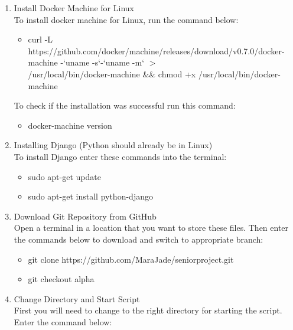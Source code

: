 \documentclass[draftclsnofoot,10pt,onecolumn]{IEEEtran} %
\begin{document}
\begin{enumerate}
	\item Install Docker Machine for Linux \\
	To install docker machine for Linux, run the command below:
	
	\begin{itemize}
		\item curl -L https://github.com/docker/machine/releases/download/v0.7.0/docker-machine -`uname -s`-`uname -m` 
		$>$ \\ /usr/local/bin/docker-machine \&\& chmod +x /usr/local/bin/docker-machine \\
	\end{itemize}
	
	To check if the installation was successful run this command:
	
	\begin{itemize}
		\item docker-machine version \\
	\end{itemize}
	
	\item Installing Django (Python should already be in Linux) \\
	
	To install Django enter these commands into the terminal:
	
	\begin{itemize}
		\item sudo apt-get update
		\item sudo apt-get install python-django \\
	\end{itemize}
	
	\item Download Git Repository from GitHub \\
	
	Open a terminal in a location that you want to store these files. Then enter the commands below to download and switch to 
	appropriate branch:
	
	\begin{itemize}
		\item git clone https://github.com/MaraJade/seniorproject.git
		\item git checkout alpha \\
	\end{itemize}
	
	\item Change Directory and Start Script \\
	
	First you will need to change to the right directory for starting the script. Enter the command below:
	

\end{enumerate}
\end{document}
